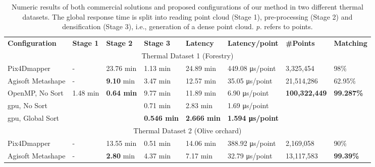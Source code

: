 \renewcommand{\arraystretch}{1.3}
\begin{table}
    \centering
    \footnotesize
    \caption{Numeric results of both commercial solutions and proposed configurations of our method in two different thermal datasets. The global response time is split into reading point cloud (Stage 1), pre-processing (Stage 2) and densification (Stage 3), i.e., generation of a dense point cloud. \textit{p.} refers to points. \\ }
    \label{table:thermal_results}
    \begin{tabular}{l@{\hskip 0.06in}|lll|l|l|l|l}
    \toprule
    \textbf{Configuration} & \textbf{Stage 1} & \textbf{Stage 2} & \textbf{Stage 3} & \textbf{Latency} & \textbf{Latency/point} & \textbf{\#Points} & \textbf{Matching}\\
    \cmidrule{1-8}
    \multicolumn{8}{c}{Thermal Dataset 1 (Forestry)}\\
    \cmidrule{1-8}
    Pix4Dmapper & - & 23.76 \si{\minute} & 1.13 \si{\minute} & 24.89 \si{\minute} & 449.08 \si{\micro\second}/point & 3,325,454 & 98\%\\
    Agisoft Metashape & - & \textbf{9.10} \si{\minute} & 3.47 \si{\minute} & 12.57 \si{\minute} & 35.05 \si{\micro\second}/point & 21,514,286 & 62.95\%\\
    \cmidrule{1-8}
    OpenMP, No Sort & \multirow{\numExperiments}{*}{1.48 \si{\minute}} & \multirow{\numExperiments}{*}{\textbf{0.64 \si{\minute}}} & 9.77 \si{\minute} & 11.89 \si{\minute} & 6.90 \si{\micro\second}/point & \multirow{\numExperiments}{*}{\textbf{100,322,449}} & \multirow{\numExperiments}{*}{\textbf{99.287\%}}\\
    \acrshort{gpu}, No Sort & & & 0.71 \si{\minute} & 2.83 \si{\minute} & 1.69 \si{\micro\second}/point & &\\
    \acrshort{gpu}, Global Sort & & & \textbf{0.546 \si{\minute}} & \textbf{2.666 \si{\minute}} & \textbf{1.594 \si{\micro\second}/point} & &\\
    \bottomrule
    \toprule
    \multicolumn{8}{c}{Thermal Dataset 2 (Olive orchard)}\\
    \cmidrule{1-8}
    Pix4Dmapper & - & 13.55 \si{\minute} & 0.51 \si{\minute} & 14.06 \si{\minute} & 388.92 \si{\micro\second}/point & 2,169,058 & 90\%\\
    Agisoft Metashape & - & \textbf{2.80} \si{\minute} & 4.37 \si{\minute} & 7.17 \si{\minute} & 32.79 \si{\micro\second}/point & 13,117,583 & \textbf{99.39\%}\\

\end{tabular}
\end{table}
